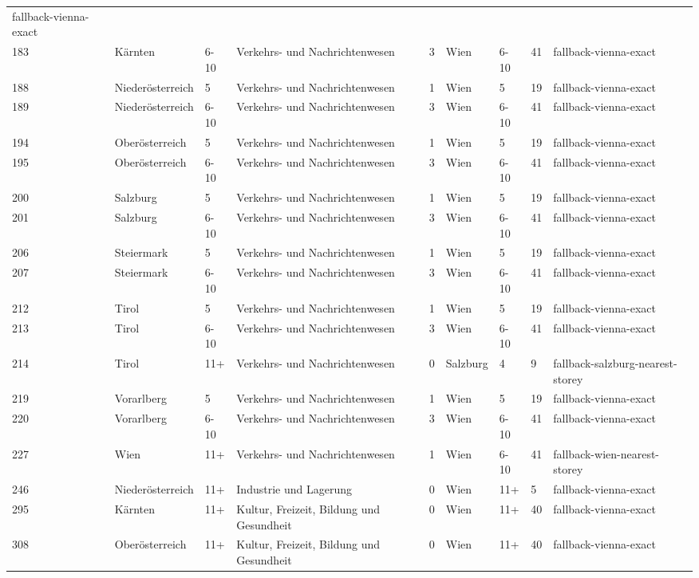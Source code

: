 \documentclass[
  ngerman,
  a4paper,
  DIV=11]{scrreprt}
\begin{document}
{\begin{longtable}[]{@{}lllllllll@{}}
fallback-vienna-exact \\
183 & Kärnten & 6-10 & Verkehrs- und Nachrichtenwesen & 3 & Wien & 6-10
& 41 & fallback-vienna-exact \\
188 & Niederösterreich & 5 & Verkehrs- und Nachrichtenwesen & 1 & Wien &
5 & 19 & fallback-vienna-exact \\
189 & Niederösterreich & 6-10 & Verkehrs- und Nachrichtenwesen & 3 &
Wien & 6-10 & 41 & fallback-vienna-exact \\
194 & Oberösterreich & 5 & Verkehrs- und Nachrichtenwesen & 1 & Wien & 5
& 19 & fallback-vienna-exact \\
195 & Oberösterreich & 6-10 & Verkehrs- und Nachrichtenwesen & 3 & Wien
& 6-10 & 41 & fallback-vienna-exact \\
200 & Salzburg & 5 & Verkehrs- und Nachrichtenwesen & 1 & Wien & 5 & 19
& fallback-vienna-exact \\
201 & Salzburg & 6-10 & Verkehrs- und Nachrichtenwesen & 3 & Wien & 6-10
& 41 & fallback-vienna-exact \\
206 & Steiermark & 5 & Verkehrs- und Nachrichtenwesen & 1 & Wien & 5 &
19 & fallback-vienna-exact \\
207 & Steiermark & 6-10 & Verkehrs- und Nachrichtenwesen & 3 & Wien &
6-10 & 41 & fallback-vienna-exact \\
212 & Tirol & 5 & Verkehrs- und Nachrichtenwesen & 1 & Wien & 5 & 19 &
fallback-vienna-exact \\
213 & Tirol & 6-10 & Verkehrs- und Nachrichtenwesen & 3 & Wien & 6-10 &
41 & fallback-vienna-exact \\
214 & Tirol & 11+ & Verkehrs- und Nachrichtenwesen & 0 & Salzburg & 4 &
9 & fallback-salzburg-nearest-storey \\
219 & Vorarlberg & 5 & Verkehrs- und Nachrichtenwesen & 1 & Wien & 5 &
19 & fallback-vienna-exact \\
220 & Vorarlberg & 6-10 & Verkehrs- und Nachrichtenwesen & 3 & Wien &
6-10 & 41 & fallback-vienna-exact \\
227 & Wien & 11+ & Verkehrs- und Nachrichtenwesen & 1 & Wien & 6-10 & 41
& fallback-wien-nearest-storey \\
246 & Niederösterreich & 11+ & Industrie und Lagerung & 0 & Wien & 11+ &
5 & fallback-vienna-exact \\
295 & Kärnten & 11+ & Kultur, Freizeit, Bildung und Gesundheit & 0 &
Wien & 11+ & 40 & fallback-vienna-exact \\
308 & Oberösterreich & 11+ & Kultur, Freizeit, Bildung und Gesundheit &
0 & Wien & 11+ & 40 & fallback-vienna-exact \\
\end{longtable}
}
\end{document}
